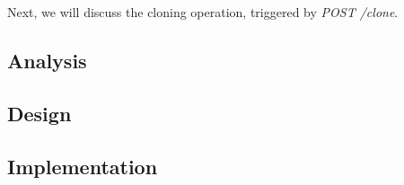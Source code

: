 \documentclass[../main.tex]{subfiles}
\begin{document}
Next, we will discuss the cloning operation, triggered by \textit{POST /clone}.

\subsection{Analysis}


\subsection{Design}


\subsection{Implementation}

\end{document}
